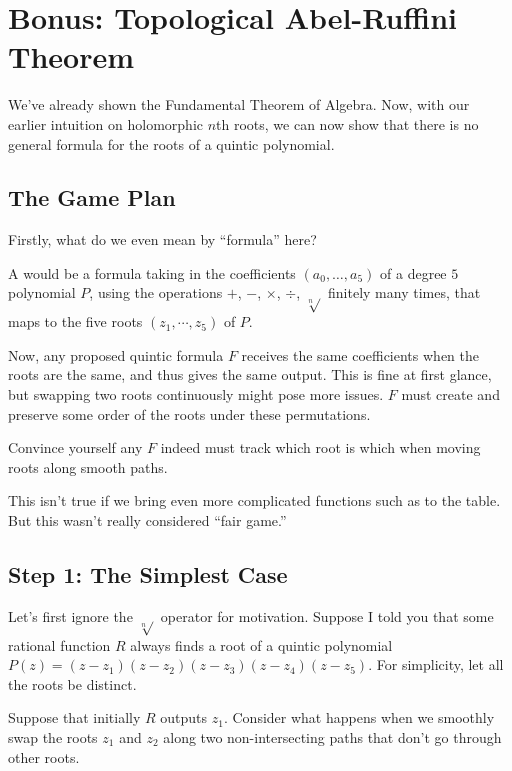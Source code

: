 \chapter{Bonus: Topological Abel-Ruffini Theorem}
\label{ch:abel_ruffini_theorem}
We've already shown the Fundamental Theorem of Algebra.
Now, with our earlier intuition on holomorphic $n$th roots,
we can now show that there is no general formula for
the roots of a quintic polynomial.

\section{The Game Plan}
Firstly, what do we even mean by ``formula'' here?

\begin{definition}
	A  would be a formula taking in the coefficients
	$(a_0, \dots, a_5)$ of a degree $5$ polynomial $P$,
	using the operations $+$, $-$, $\times$, $\div$, $\sqrt[n]{}$
	finitely many times, that maps to the five roots $(z_1, \cdots, z_5)$ of $P$.
\end{definition}

Now, any proposed quintic formula $F$ receives the same coefficients when the roots are the same,
and thus gives the same output. This is fine at first glance, but swapping two roots continuously
might pose more issues. $F$ must create and preserve some order of the roots under these permutations.

\begin{ques}
	Convince yourself any $F$ indeed must track which root is which when moving roots along
	smooth paths.
\end{ques}

\begin{remark}
	This isn't true if we bring even more complicated functions
	such as  to the table.
	But this wasn't really considered ``fair game.''
\end{remark}

\section{Step 1: The Simplest Case}
Let's first ignore the $\sqrt[n]{}$ operator for motivation.
Suppose I told you that some rational function $R$ always finds
a root of a quintic polynomial $P(z) = (z - z_1)(z - z_2)(z - z_3)(z - z_4)(z - z_5)$.
For simplicity, let all the roots be distinct.

Suppose that initially $R$ outputs $z_1$. Consider what happens when we smoothly swap the roots $z_1$ and $z_2$
along two non-intersecting paths that don't go through other roots.


